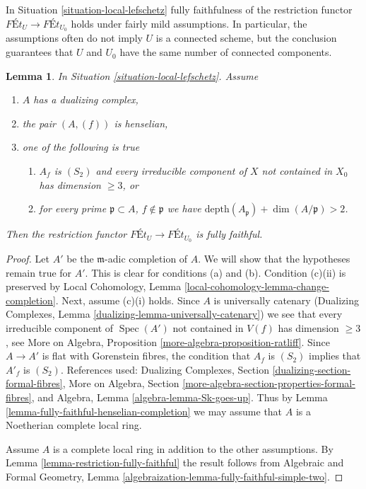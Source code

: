 \documentclass{stacks-project}
\theoremstyle{plain}
\newtheorem{lemma}[subsection]{Lemma}
\theoremstyle{definition}
\theoremstyle{remark}
\numberwithin{equation}{subsection}
\def\Spec{\mathop{\mathrm{Spec}}}
\begin{document}
\noindent
In Situation \ref{situation-local-lefschetz}
fully faithfulness of the restriction functor
$\textit{F\'Et}_U \longrightarrow \textit{F\'Et}_{U_0}$
holds under fairly mild assumptions.
In particular, the assumptions often do not imply
$U$ is a connected scheme, but the conclusion guarantees
that $U$ and $U_0$ have the same number of connected components.

\begin{lemma}
\label{lemma-fully-faithful-simple}
In Situation \ref{situation-local-lefschetz}. Assume
\begin{enumerate}
\item[(a)] $A$ has a dualizing complex,
\item[(b)] the pair $(A, (f))$ is henselian,
\item[(c)] one of the following is true
\begin{enumerate}
\item[(i)] $A_f$ is $(S_2)$ and every irreducible component of $X$
not contained in $X_0$ has dimension $\geq 3$, or
\item[(ii)] for every prime
$\mathfrak p \subset A$, $f \not \in \mathfrak p$ we have
$\text{depth}(A_\mathfrak p) + \dim(A/\mathfrak p) > 2$.
\end{enumerate}
\end{enumerate}
Then the restriction functor
$\textit{F\'Et}_U \longrightarrow \textit{F\'Et}_{U_0}$
is fully faithful.
\end{lemma}

\begin{proof}
Let $A'$ be the $\mathfrak m$-adic completion of $A$. We will show that
the hypotheses remain true for $A'$. This is clear for conditions
(a) and (b). Condition (c)(ii) is preserved by
Local Cohomology, Lemma \ref{local-cohomology-lemma-change-completion}.
Next, assume (c)(i) holds. Since $A$ is universally catenary
(Dualizing Complexes, Lemma \ref{dualizing-lemma-universally-catenary})
we see that every irreducible component of $\Spec(A')$ not contained in $V(f)$
has dimension $\geq 3$, see
More on Algebra, Proposition \ref{more-algebra-proposition-ratliff}.
Since $A \to A'$ is flat with Gorenstein fibres,
the condition that $A_f$ is $(S_2)$ implies that $A'_f$ is $(S_2)$.
References used:
Dualizing Complexes, Section \ref{dualizing-section-formal-fibres},
More on Algebra, Section \ref{more-algebra-section-properties-formal-fibres},
and Algebra, Lemma \ref{algebra-lemma-Sk-goes-up}.
Thus by Lemma \ref{lemma-fully-faithful-henselian-completion}
we may assume that $A$ is a Noetherian complete local ring.

\medskip\noindent
Assume $A$ is a complete local ring in addition to the other assumptions.
By Lemma \ref{lemma-restriction-fully-faithful} the result follows from
Algebraic and Formal Geometry, Lemma
\ref{algebraization-lemma-fully-faithful-simple-two}.
\end{proof}
\end{document}
